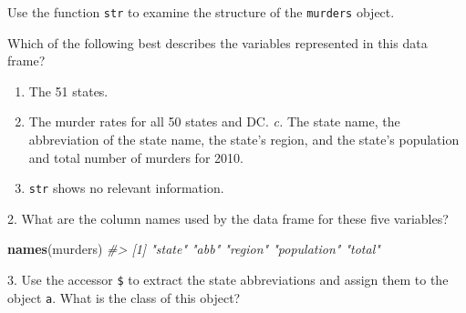 \documentclass[
]{krantz}
\newenvironment{Shaded}{\begin{snugshade}}{\end{snugshade}}
\newcommand{\CommentTok}[1]{\textcolor[rgb]{0.37,0.37,0.37}{\textit{#1}}}
\newcommand{\KeywordTok}[1]{\textcolor[rgb]{0.27,0.27,0.27}{\textbf{#1}}}
\newcommand{\NormalTok}[1]{#1}
\newcommand{\OperatorTok}[1]{\textcolor[rgb]{0.43,0.43,0.43}{\textbf{#1}}}
\newcommand{\StringTok}[1]{\textcolor[rgb]{0.5,0.5,0.5}{#1}}
\providecommand{\tightlist}{%
  \setlength{\itemsep}{0pt}\setlength{\parskip}{0pt}}
\begin{document}
Use the function \texttt{str} to examine the structure of the \texttt{murders} object.

\begin{Shaded}
\end{Shaded}

Which of the following best describes the variables represented in this data frame?

\begin{enumerate}
\def\labelenumi{\alph{enumi}.}
\tightlist
\item
  The 51 states.
\item
  The murder rates for all 50 states and DC.
  \emph{c.} The state name, the abbreviation of the state name, the state's region, and the state's population and total number of murders for 2010.
\item
  \texttt{str} shows no relevant information.
\end{enumerate}

2. What are the column names used by the data frame for these five variables?

\begin{Shaded}
\begin{Highlighting}[]
\KeywordTok{names}\NormalTok{(murders)}
\CommentTok{#> [1] "state"      "abb"        "region"     "population" "total"}
\end{Highlighting}
\end{Shaded}

3. Use the accessor \texttt{\$} to extract the state abbreviations and assign them to the object \texttt{a}. What is the class of this object?

\begin{Shaded}
\end{Shaded}
\end{document}
